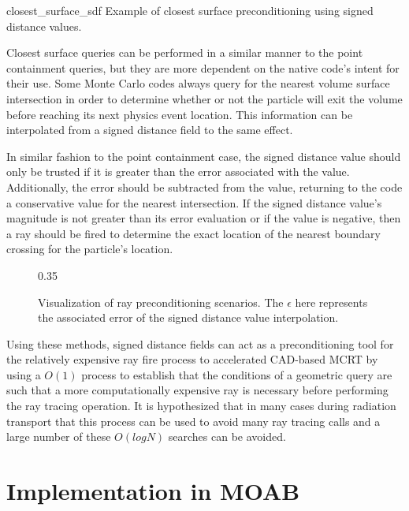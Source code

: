              {closest_surface_sdf}
             {Example of closest surface preconditioning using signed distance values.}
             {
               Closest surface queries can be performed in a similar manner to the point
               containment queries, but they are more dependent on the native code's intent
               for their use. Some Monte Carlo codes always query for the nearest volume surface
               intersection in order to determine whether or not the particle will exit the
               volume before reaching its next physics event location. This information can
               be interpolated from a signed distance field to the same effect.
               
               In similar fashion to the point containment case, the signed distance value
               should only be trusted if it is greater than the error associated with the
               value. Additionally, the error should be subtracted from the value, returning
               to the code a conservative value for the nearest intersection. If the signed
               distance value's magnitude is not greater than its error evaluation or if the
               value is negative, then a ray should be fired to determine the exact location
               of the nearest boundary crossing for the particle's location.
             }

\begin{figure}[ht]
  \center
  {0.35\textwidth}
  \caption{Visualization of ray preconditioning scenarios. The $\epsilon$ here represents
    the associated error of the signed distance value interpolation.}
  \label{fig:precondition_ray}
\end{figure}

Using these methods, signed distance fields can act as a preconditioning tool
for the relatively expensive ray fire process to accelerated CAD-based MCRT by
using a $O(1)$ process to establish that the conditions of a geometric query are
such that a more computationally expensive ray is necessary before performing
the ray tracing operation. It is hypothesized that in many cases during
radiation transport that this process can be used to avoid many ray tracing
calls and a large number of these $O(logN)$ searches can be avoided.

\section{Implementation in MOAB}

